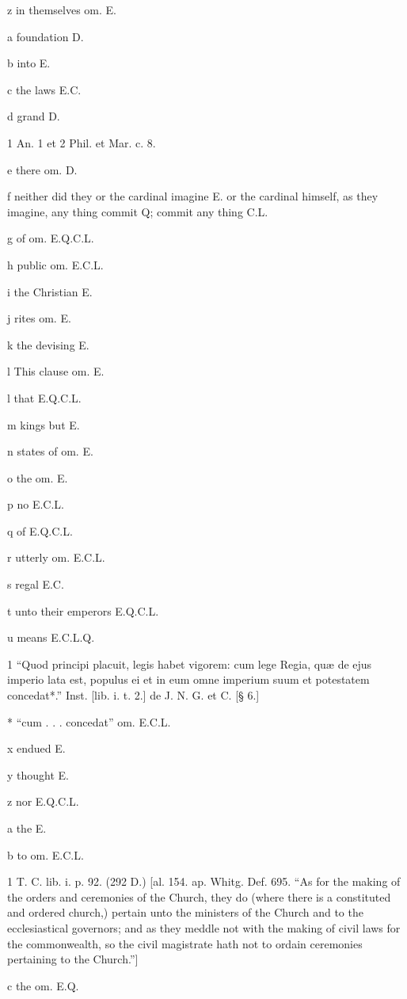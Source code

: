 z
in themselves om. E.

a
foundation D.

b
into E.

c
the laws E.C.

d
grand D.

1
An. 1 et 2 Phil. et Mar. c. 8.

e
there om. D.

f
neither did they or the cardinal imagine E. or the cardinal himself, as they imagine, any thing commit Q; commit any thing C.L.

g
of om. E.Q.C.L.

h
public om. E.C.L.

i
the Christian E.

j
rites om. E.

k
the devising E.

l
This clause om. E.

l
that E.Q.C.L.

m
kings but E.

n
states of om. E.

o
the om. E.

p
no E.C.L.

q
of E.Q.C.L.

r
utterly om. E.C.L.

s
regal E.C.

t
unto their emperors E.Q.C.L.

u
means E.C.L.Q.

1
“Quod principi placuit, legis habet vigorem: cum lege Regia, quæ de ejus imperio lata est, populus ei et in eum omne imperium suum et potestatem concedat*.” Inst. [lib. i. t. 2.] de J. N. G. et C. [§ 6.]

*
“cum . . . concedat” om. E.C.L.

x
endued E.

y
thought E.

z
nor E.Q.C.L.

a
the E.

b
to om. E.C.L.

1
T. C. lib. i. p. 92. (292 D.) [al. 154. ap. Whitg. Def. 695. “As for the making of the orders and ceremonies of the Church, they do (where there is a constituted and ordered church,) pertain unto the ministers of the Church and to the ecclesiastical governors; and as they meddle not with the making of civil laws for the commonwealth, so the civil magistrate hath not to ordain ceremonies pertaining to the Church.”]

c
the om. E.Q.

